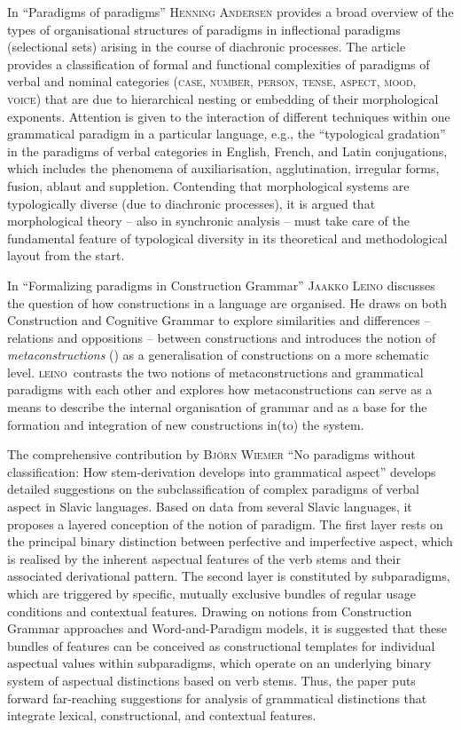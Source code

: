 \documentclass[output=paper]{langsci/langscibook}
\begin{document}
In “Paradigms of paradigms” \textsc{Henning} \textsc{Andersen} provides a broad overview of the types of organisational structures of paradigms in inflectional paradigms (selectional sets) arising in the course of diachronic processes. The article provides a classification of formal and functional complexities of paradigms of verbal and nominal categories (\textsc{case,} \textsc{number,} \textsc{person,} \textsc{tense,} \textsc{aspect,} \textsc{mood,} \textsc{voice}) that are due to hierarchical nesting or embedding of their morphological exponents. Attention is given to the interaction of different techniques within one grammatical paradigm in a particular language, e.g., the “typological gradation” in the paradigms of verbal categories in English, French, and Latin conjugations, which includes the phenomena of auxiliarisation, agglutination, irregular forms, fusion, ablaut and suppletion. Contending that morphological systems are typologically diverse (due to diachronic processes), it is argued that morphological theory – also in synchronic analysis – must take care of the fundamental feature of typological diversity in its theoretical and methodological layout from the start.

In “Formalizing paradigms in Construction Grammar” \textsc{Jaakko} \textsc{Leino} discusses the question of how constructions in a language are organised. He draws on both Construction and Cognitive Grammar to explore similarities and differences – relations and oppositions – between constructions and introduces the notion of \textit{metaconstructions} (\citealt{Leino2003, LeinoÖstman2005}) as a generalisation of constructions on a more schematic level. \textsc{leino~}contrasts the two notions of metaconstructions and grammatical paradigms with each other and explores how metaconstructions can serve as a means to describe the internal organisation of grammar and as a base for the formation and integration of new constructions in(to) the system.

The comprehensive contribution by \textsc{Björn} \textsc{Wiemer} “No paradigms without classification: How stem-derivation develops into grammatical aspect” develops detailed suggestions on the subclassification of complex paradigms of verbal aspect in Slavic languages. Based on data from several Slavic languages, it proposes a layered conception of the notion of paradigm. The first layer rests on the principal binary distinction between perfective and imperfective aspect, which is realised by the inherent aspectual features of the verb stems and their associated derivational pattern. The second layer is constituted by subparadigms, which are triggered by specific, mutually exclusive bundles of regular usage conditions and contextual features. Drawing on notions from Construction Grammar approaches and Word-and-Paradigm models, it is suggested that these bundles of features can be conceived as constructional templates for individual aspectual values within subparadigms, which operate on an underlying binary system of aspectual distinctions based on verb stems. Thus, the paper puts forward far-reaching suggestions for analysis of grammatical distinctions that integrate lexical, constructional, and contextual features.
\end{document}
